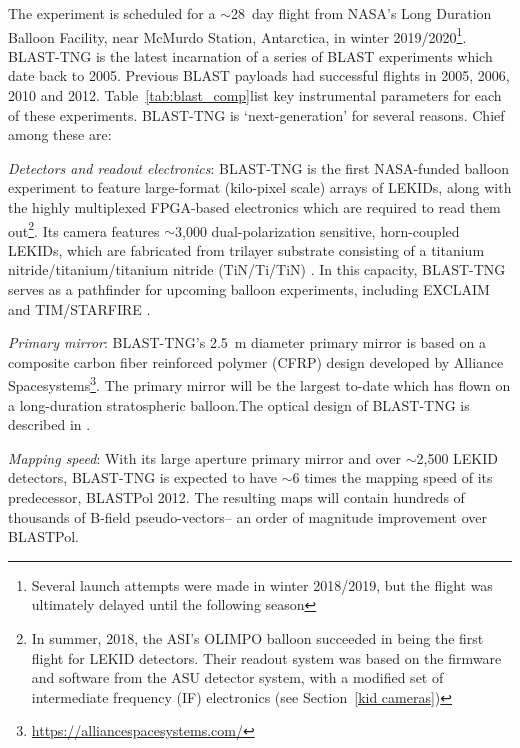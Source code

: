 The experiment is scheduled for a $\sim$28~day flight from NASA's Long Duration Balloon Facility, near McMurdo Station, Antarctica, in winter 2019/2020\footnote{Several launch attempts were made in winter 2018/2019, but the flight was ultimately delayed until the following season}. BLAST-TNG is the latest incarnation of a series of BLAST experiments which date back to 2005. Previous BLAST payloads had successful flights in 2005, 2006, 2010 and 2012. Table~\ref{tab:blast_comp}list key instrumental parameters for each of these experiments. BLAST-TNG is `next-generation' for several reasons. Chief among these are:

\vspace{5mm}

\textit{Detectors and readout electronics}: BLAST-TNG is the first NASA-funded balloon experiment to feature large-format (kilo-pixel scale) arrays of LEKIDs, along with the highly multiplexed FPGA-based electronics which are required to read them out\footnote{In summer, 2018, the ASI's OLIMPO balloon succeeded in being the first flight for LEKID detectors. Their readout system was based on the firmware and software from the ASU detector system, with a modified set of intermediate frequency (IF) electronics (see Section~\ref{kid cameras})}. Its camera features $\sim$3,000 dual-polarization sensitive, horn-coupled LEKIDs, which are fabricated from trilayer substrate consisting of a titanium nitride/titanium/titanium nitride (TiN/Ti/TiN) \citep{hubmayr2014dual}. In this capacity, BLAST-TNG serves as a pathfinder for upcoming balloon experiments, including EXCLAIM \citep{switzer2017measuring} and TIM/STARFIRE \citep{aguirre2018starfire}.

\vspace{5mm}

\textit{Primary mirror}: BLAST-TNG's 2.5~m diameter primary mirror is based on a composite carbon fiber reinforced polymer (CFRP) design developed by Alliance Spacesystems\footnote{\url{https://alliancespacesystems.com/}}. The primary mirror will be the largest to-date which has flown on a long-duration stratospheric balloon.The optical design of BLAST-TNG is described in \citet{lourie2018design}.

\vspace{5mm}

\textit{Mapping speed}: With its large aperture primary mirror and over $\sim$2,500 LEKID detectors, BLAST-TNG is expected to have $\sim$6 times the mapping speed of its predecessor, BLASTPol 2012. The resulting maps will contain hundreds of thousands of B-field pseudo-vectors-- an order of magnitude improvement over BLASTPol.

